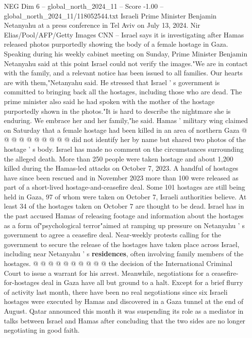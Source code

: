 \begin{textsample}{NEG Dim 6 – global\_north\_2024\_11 – Score -1.00 – global\_north\_2024\_11/118052544.txt}  \label{ex:f6_neg_098}
Israeli Prime Minister Benjamin Netanyahu at a press conference in Tel Aviv on July 13, 2024.
Nir Elias/Pool/AFP/Getty Images CNN -- Israel says it is investigating after Hamas released photos purportedly showing the body of a female hostage in Gaza.
Speaking during his weekly cabinet meeting on Sunday, Prime Minister Benjamin Netanyahu said at this point Israel could not verify the images."We are in contact with the family, and a relevant notice has been issued to all families.
Our hearts are with them,"Netanyahu said.
He stressed that Israel ' s government is committed to bringing back all the hostages, including those who are dead.
The prime minister also said he had spoken with the mother of the hostage purportedly shown in the photos."It is hard to describe the nightmare she is enduring.
We embrace her and her family,"he said.
Hamas ' military wing claimed on Saturday that a female hostage had been killed in an area of northern Gaza @ @ @ @ @ @ @ @ @ @ did not identify her by name but shared two photos of the hostage ' s body.
Israel has made no comment on the circumstances surrounding the alleged death.
More than 250 people were taken hostage and about 1,200 killed during the Hamas-led attacks on October 7, 2023.
A handful of hostages have since been rescued and in November 2023 more than 100 were released as part of a short-lived hostage-and-ceasefire deal.
Some 101 hostages are still being held in Gaza, 97 of whom were taken on October 7, Israeli authorities believe.
At least 34 of the hostages taken on October 7 are thought to be dead.
Israel has in the past accused Hamas of releasing footage and information about the hostages as a form of"psychological terror"aimed at ramping up pressure on Netanyahu ' s government to agree a ceasefire deal.
Near-weekly protests calling for the government to secure the release of the hostages have taken place across Israel, including near Netanyahu ' s \textbf{residences}, often involving family members of the hostages. @ @ @ @ @ @ @ @ @ @ the decision of the International Criminal Court to issue a warrant for his arrest.
Meanwhile, negotiations for a ceasefire-for-hostages deal in Gaza have all but ground to a halt.
Except for a brief flurry of activity last month, there have been no real negotiations since six Israeli hostages were executed by Hamas and discovered in a Gaza tunnel at the end of August.
Qatar announced this month it was suspending its role as a mediator in talks between Israel and Hamas after concluding that the two sides are no longer negotiating in good faith.

\end{textsample}
